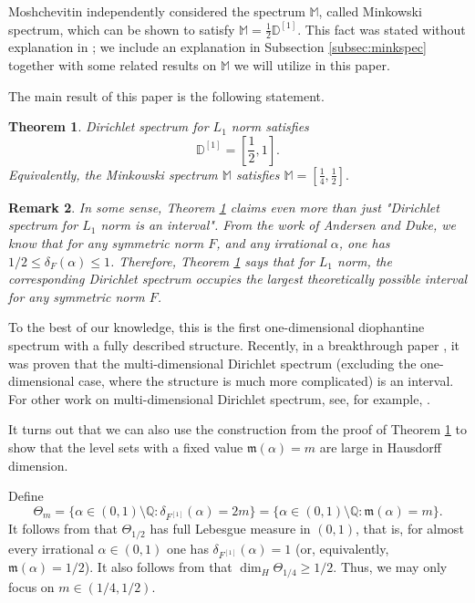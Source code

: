 \documentclass[11pt]{amsart}
\newtheorem{theorem}{Theorem}[section]
\newtheorem{remark}[theorem]{Remark}
\newcommand{\Q}{\mathbb Q}
\newcommand{\MS}{\mathbb M}
\begin{document}
Moshchevitin \cite{MR3025470} independently considered the spectrum $\MS$, called Minkowski spectrum, which can be shown to satisfy $\MS = \frac12 \mathbb{D}^{[1]}$. This fact was stated without explanation in \cite{moshchevitin2025dirichletimprovabilitylpnorms}; we include an explanation in Subsection \ref{subsec:minkspec} together with some related results on $\MS$ we will utilize in this paper. 



The main result of this paper is the following statement.
\begin{theorem}\label{thm:main}
Dirichlet spectrum for $L_1$ norm satisfies 
$$\mathbb{D}^{[1]} = \left[\frac12,1\right].$$
Equivalently, the Minkowski spectrum $\MS$ satisfies $\MS=\left[\frac14,\frac12\right].$
\end{theorem}
\begin{remark}
    In some sense, Theorem \ref{thm:main} claims even more than just "Dirichlet spectrum for $L_1$ norm is an interval". From the work \cite{AD} of Andersen and Duke, we know that for any symmetric norm $F$, and any irrational $\alpha$, one has $1/2 \leq \delta_F(\alpha)\leq1$. Therefore, Theorem \ref{thm:main} says that for $L_1$ norm, the corresponding Dirichlet spectrum occupies the largest theoretically possible interval for any symmetric norm $F$.
\end{remark}
To the best of our knowledge, this is the first one-dimensional diophantine spectrum with a fully described structure. 
Recently, in a breakthrough paper \cite{agin2024dirichletspectrum}, it was proven that the multi-dimensional Dirichlet spectrum (excluding the one-dimensional case, where the structure is much more complicated) is an interval. For other work on multi-dimensional Dirichlet spectrum, see, for example, \cite{MR4618228, MR4662891}.



It turns out that we can also use the construction from the proof of Theorem \ref{thm:main} to show that the level sets with a fixed value $\mathfrak m(\alpha)=m$ are large in Hausdorff dimension. 

Define
$$
        \Theta_m= \{\alpha\in(0,1)\setminus\Q: \delta_{F^{[1]}}(\alpha)=2m\} =\{\alpha\in(0,1)\setminus\Q:\mathfrak m(\alpha)=m\}.
$$
It follows from \cite{AD} that $\Theta_{1/2}$ has full Lebesgue measure in $(0,1)$, that is, for almost every irrational $\alpha\in(0,1)$ one has $\delta_{F^{[1]}}(\alpha)=1$ (or, equivalently, $\mathfrak{m}(\alpha) = 1/2$). It also follows from \cite{MR3025470} that $\dim_H \Theta_{1/4} \geq 1/2$. Thus, we may only focus on $m\in(1/4,1/2)$.
\end{document}
